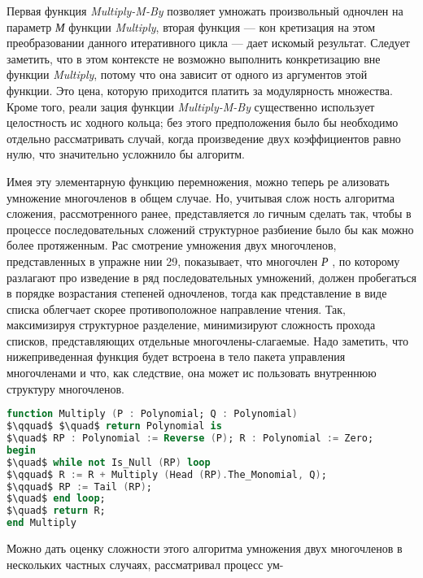 \par Первая функция {\it Multiply-M-By} позволяет умножать произвольный
одночлен на параметр {\it М} функции {\it Multiply}, вторая функция — кон­
кретизация на этом преобразовании данного итеративного цикла —
дает искомый результат. Следует заметить, что в этом контексте не­
возможно выполнить конкретизацию вне функции {\it Multiply}, потому что
она зависит от одного из аргументов этой функции. Это цена, которую
приходится платить за модулярность множества. Кроме того, реали­
зация функции {\it Multiply-M-By} существенно использует целостность ис­
ходного кольца; без этого предположения было бы необходимо отдельно
рассматривать случай, когда произведение двух коэффициентов равно
нулю, что значительно усложнило бы алгоритм.
\par Имея эту элементарную функцию перемножения, можно теперь ре­
ализовать умножение многочленов в общем случае. Но, учитывая слож­
ность алгоритма сложения, рассмотренного ранее, представляется ло­
гичным сделать так, чтобы в процессе последовательных сложений
структурное разбиение было бы как можно более протяженным. Рас­
смотрение умножения двух многочленов, представленных в упражне­
нии 29, показывает, что многочлен {\it Р} , по которому разлагают про­
изведение в ряд последовательных умножений, должен пробегаться в
порядке возрастания степеней одночленов, тогда как представление в
виде списка облегчает скорее противоположное направление чтения.
Так, максимизируя структурное разделение, минимизируют сложность
прохода списков, представляющих отдельные многочлены-слагаемые.
Надо заметить, что нижеприведенная функция будет встроена в тело
пакета управления многочленами и что, как следствие, она может ис­
пользовать внутреннюю структуру многочленов.

\begin{lstlisting}[mathescape=true, language=Ada, basicstyle=\small]
function Multiply (P : Polynomial; Q : Polynomial)
$\qquad$ $\quad$ return Polynomial is
$\quad$ RP : Polynomial := Reverse (P); R : Polynomial := Zero;
begin
$\quad$ while not Is_Null (RP) loop
$\qquad$ R := R + Multiply (Head (RP).The_Monomial, Q);
$\qquad$ RP := Tail (RP);
$\quad$ end loop;
$\quad$ return R;
end Multiply
\end{lstlisting}

\par Можно дать оценку сложности этого алгоритма умножения двух
многочленов в нескольких частных случаях, рассматривал процесс ум-
\newpage


